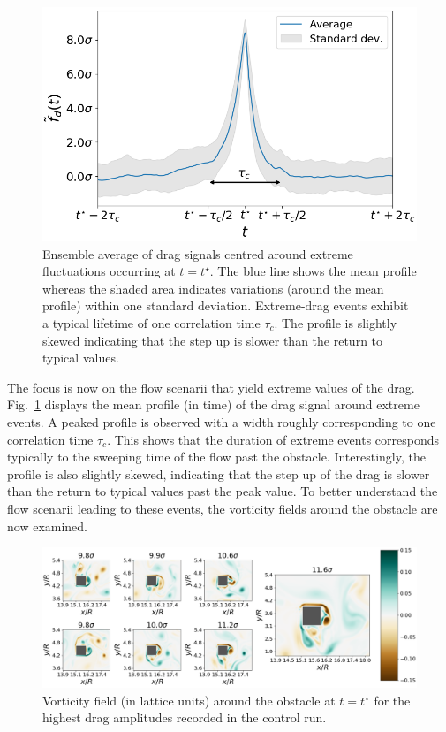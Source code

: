 \documentclass{jfm}
\newcommand{\EL}[1]{{\color{myred}{#1}}}
\begin{document}
\begin{figure}
	\centering
	\includegraphics[width=.7\linewidth]{timeseries_extremes/timeseries_extremes.png}
	\caption{\label{fig:timeseries_extremes} Ensemble average of drag signals centred around extreme fluctuations occurring  at $t=t^{\star}$. The blue line shows the mean profile whereas the shaded area indicates variations (around the mean profile) within one standard deviation. Extreme-drag events exhibit a typical lifetime of one correlation time $\tau_c$. The profile is slightly skewed indicating that the step up is slower than the return to typical values.}
\end{figure}

%
The focus is now on the flow scenarii that yield extreme values of the drag. 
Fig.~\ref{fig:timeseries_extremes} displays the mean profile (in time) of the drag signal around extreme events. A peaked profile is observed with a width roughly corresponding to one correlation time $\tau_c$. This shows that the duration of extreme events corresponds typically to the sweeping time of the flow past the obstacle. 
Interestingly, the profile is also slightly skewed, indicating that the step up of the drag is slower than the return to typical values past the peak value.
\EL{This asymmetry (under time reversal) is closely linked to the symmetry breaking in what happens before and after the obstacle.}
To better understand the flow scenarii leading to these events, the vorticity fields around the obstacle are now examined.

\begin{figure}
	\centering
	\includegraphics[width=\linewidth]{illustr_extrms_vorticity/illustr_extrms_vorticity.png}
	\caption{\label{fig:top_4_events_vorticity} Vorticity field (in lattice units) around the obstacle at $t=t^{\star}$ for the highest drag amplitudes recorded in the control run.
	}
\end{figure}
\end{document}
